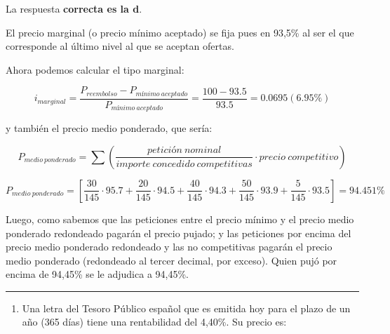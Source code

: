 \documentclass[
  letterpaper,
  DIV=11,
  numbers=noendperiod]{scrreprt}
\providecommand{\tightlist}{%
  \setlength{\itemsep}{0pt}\setlength{\parskip}{0pt}}\usepackage{longtable,booktabs,array}
\begin{document}
\begin{tcolorbox}[enhanced jigsaw, left=2mm, opacityback=0, colback=white, breakable, arc=.35mm, bottomrule=.15mm, rightrule=.15mm, toprule=.15mm, leftrule=.75mm, colframe=quarto-callout-tip-color-frame]
\begin{minipage}[t]{5.5mm}
\textcolor{quarto-callout-tip-color}{\faLightbulb}
\end{minipage}%
\begin{minipage}[t]{\textwidth - 5.5mm}

La respuesta \textbf{correcta es la d}.

El precio marginal (o precio mínimo aceptado) se fija pues en 93,5\% al
ser el que corresponde al último nivel al que se aceptan ofertas.

Ahora podemos calcular el tipo marginal:

\[i_{marginal}=\frac{P_{reembolso}-P_{mínimo\ aceptado}}{P_{mínimo\ aceptado}}=\frac{100-93.5}{93.5}=0.0695(6.95\%)\]

y también el precio medio ponderado, que sería:

\[P_{medio\ ponderado}=\sum\left(\frac{petición\ nominal}{importe\ concedido\ competitivas}\cdot precio\ competitivo\right)\]

\[P_{medio\ ponderado}= \left[\frac{30}{145}\cdot95.7+\frac{20}{145}\cdot94.5+\frac{40}{145}\cdot94.3+\frac{50}{145}\cdot93.9 +\frac{5}{145}\cdot93.5\right]=94.451\%\]

Luego, como sabemos que las peticiones entre el precio mínimo y el
precio medio ponderado redondeado pagarán el precio pujado; y las
peticiones por encima del precio medio ponderado redondeado y las no
competitivas pagarán el precio medio ponderado (redondeado al tercer
decimal, por exceso). Quien pujó por encima de 94,45\% se le adjudica a
94,45\%.

\end{minipage}%
\end{tcolorbox}

\begin{center}\rule{0.5\linewidth}{0.5pt}\end{center}

\begin{enumerate}
\def\labelenumi{\arabic{enumi}.}
\setcounter{enumi}{6}
\tightlist
\item
  Una letra del Tesoro Público español que es emitida hoy para el plazo
  de un año (365 días) tiene una rentabilidad del 4,40\%. Su precio es:
\end{enumerate}
\end{document}
